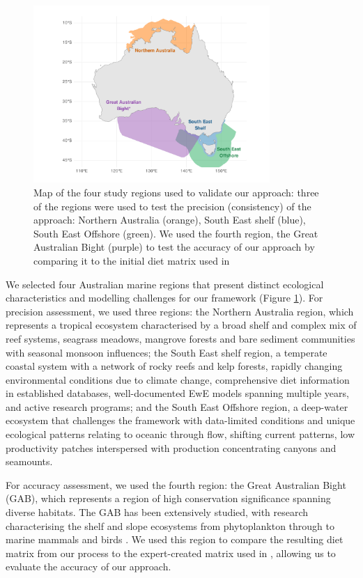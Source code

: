 \begin{figure}[htbp]
    \centering
    \includegraphics[width=0.8\textwidth]{figures/validation_regions.pdf}
    \caption{Map of the four study regions used to validate our approach: three of the regions were used to test the precision (consistency) of the approach: Northern Australia (orange), South East shelf (blue), South East Offshore (green). We used the fourth region, the Great Australian Bight (purple) to test the accuracy of our approach by comparing it to the initial diet matrix used in \citep{Fulton2018}}
    \label{fig:validation_regions}
    \end{figure}

We selected four Australian marine regions that present distinct ecological characteristics and modelling challenges for our framework (Figure \ref{fig:validation_regions}). For precision assessment, we used three regions: the Northern Australia region, which represents a tropical ecosystem characterised by a broad shelf and complex mix of reef systems, seagrass meadows, mangrove forests and bare sediment communities with seasonal monsoon influences; the South East shelf region, a temperate coastal system with a network of rocky reefs and kelp forests, rapidly changing environmental conditions due to climate change, comprehensive diet information in established databases, well-documented EwE models spanning multiple years, and active research programs; and the South East Offshore region, a deep-water ecosystem that challenges the framework with data-limited conditions and unique ecological patterns relating to oceanic through flow, shifting current patterns, low productivity patches interspersed with production concentrating canyons and seamounts.

For accuracy assessment, we used the fourth region: the Great Australian Bight (GAB), which represents a region of high conservation significance spanning diverse habitats. The GAB has been extensively studied, with research characterising the shelf and slope ecosystems from phytoplankton through to marine mammals and birds \citep{goldsworthy2013trophodynamics, Fulton2018}. We used this region to compare the resulting diet matrix from our process to the expert-created matrix used in \citep{Fulton2018}, allowing us to evaluate the accuracy of our approach.

